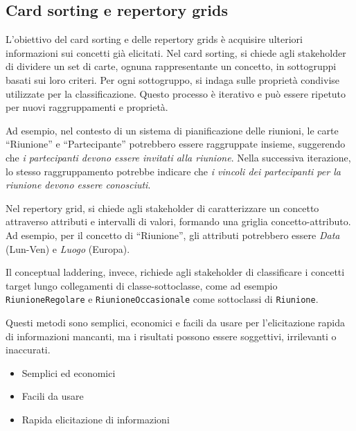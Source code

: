 \subsection{Card sorting e repertory grids}

L'obiettivo del card sorting e delle repertory grids è acquisire ulteriori
informazioni sui concetti già elicitati. Nel card sorting, si chiede agli
stakeholder di dividere un set di carte, ognuna rappresentante un concetto,
in sottogruppi basati sui loro criteri. Per ogni sottogruppo, si indaga sulle 
proprietà condivise utilizzate per la classificazione. Questo processo è 
iterativo e può essere ripetuto per nuovi raggruppamenti e proprietà.

Ad esempio, nel contesto di un sistema di pianificazione delle riunioni, 
le carte ``Riunione'' e ``Partecipante'' potrebbero essere raggruppate insieme, 
suggerendo che \textit{i partecipanti devono essere invitati alla riunione}. Nella 
successiva iterazione, lo stesso raggruppamento potrebbe indicare che
\textit{i vincoli dei partecipanti per la riunione devono essere conosciuti}.

Nel repertory grid, si chiede agli stakeholder di caratterizzare un concetto
attraverso attributi e intervalli di valori, formando una griglia
concetto-attributo. Ad esempio, per il concetto di ``Riunione'', gli attributi
potrebbero essere \textit{Data} (Lun-Ven) e \textit{Luogo} (Europa).

Il conceptual laddering, invece, richiede agli stakeholder di classificare
i concetti target lungo collegamenti di classe-sottoclasse, come ad esempio
\texttt{RiunioneRegolare} e \texttt{RiunioneOccasionale} come sottoclassi
di \texttt{Riunione}.

Questi metodi sono semplici, economici e facili da usare per l'elicitazione
rapida di informazioni mancanti, ma i risultati possono essere soggettivi,
irrilevanti o inaccurati.

\begin{tcolorbox}[colback=green!5!white,colframe=green!75!black, title=Pro del card sorting e repertory grids]
    \begin{itemize}
        \item Semplici ed economici
        \item Facili da usare
        \item Rapida elicitazione di informazioni
    \end{itemize}
\end{tcolorbox}

